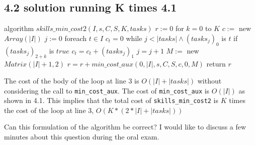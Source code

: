 \documentclass[paper=a4, fontsize=11pt]{scrartcl} %
\numberwithin{equation}{section} %
\numberwithin{figure}{section} %
\numberwithin{table}{section} %
\begin{document}
\newpage
\subsection*{4.2 solution running K times 4.1}

\begin{pseudo}
algorithm $skills\_min\_cost2(I, s, C, S, K, tasks)$
    $r := 0$
    for $k = 0$ to $K$
        $c :=$ new $Array(|I|)$
        $j := 0$
        foreach $t \in I$
            $c_t = 0$
            while $j < |tasks| \land (tasks_j)_0$ is $t$
                if $(tasks_j)_{2+k}$ is $true$
                    $c_t = c_t + (tasks_j)_1$
                $j = j +1$
        $M :=$ new $Matrix(|I|+1, 2)$
        $r = r + min\_cost\_aux(0, |I|, s, C, S, c, 0, M)$
    return $r$
\end{pseudo}

The cost of the body of the loop at line 3 is $O(|I|+|tasks|)$ without considering the call to \verb|min_cost_aux|.
The cost of \verb|min_cost_aux| is $O(|I|)$ as shown in 4.1.
This implies that the total cost of \verb|skills_min_cost2| is $K$ times the cost of the loop at line 3, $O(K*(2*|I|+|tasks|))$

Can this formulation of the algorithm be correct? I would like to discuss a few minutes about this question during the oral exam.

\vfill
 

\end{document}
